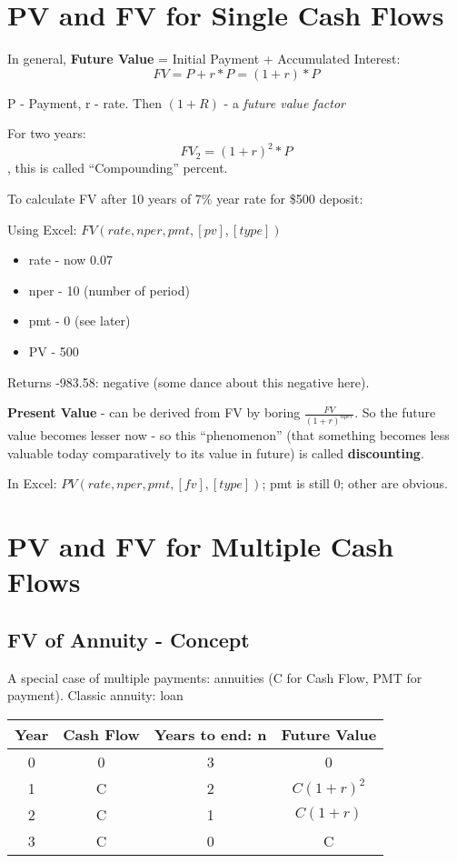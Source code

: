 \documentclass{scrartcl}
\begin{document}
\section{PV and FV for Single Cash Flows}
\label{sec:2-1}
In general, {\bf Future Value} = Initial Payment + Accumulated Interest: $$FV =
P + r * P = (1+r) * P$$

P - Payment, r - rate. Then $(1 + R)$ - a {\it future value factor}

For two years: $$FV_2 = (1 + r)^2 * P$$, this is called ``Compounding'' percent.

To calculate FV after 10 years of 7\% year rate for \$500 deposit:

Using Excel: $FV(rate, nper, pmt, [pv], [type])$
\begin{itemize}
\item rate - now 0.07
\item nper - 10 (number of period)
\item pmt - 0 (see later)
\item PV - 500
\end{itemize}
Returns -983.58: negative (some dance about this negative here).

{\bf Present Value} - can be derived from FV by boring
$\frac{FV}{(1+r)^{nper}}$. So the future value becomes lesser now - so this
``phenomenon'' (that something becomes less valuable today comparatively to its
value in future) is called {\bf discounting}.

In Excel: $PV(rate, nper, pmt, [fv],[type])$; pmt is still 0; other are obvious.

\section { PV and FV for Multiple Cash Flows}
\label{sec:2-2}

\subsection{FV of Annuity - Concept}
\label{sec:3-2}

A special case of multiple payments: annuities (C for Cash Flow, PMT for
payment). Classic annuity: loan

\begin{tabular}{c|c|c|c}
  Year & Cash Flow & Years to end: n & Future Value \\
  \hline
  0 & 0 & 3 & 0 \\
  1 & C & 2 & $C(1 + r)^2$ \\
  2 & C & 1 & $C(1 + r)$ \\
  3 & C & 0 & C
\end{tabular}
\end{document}

